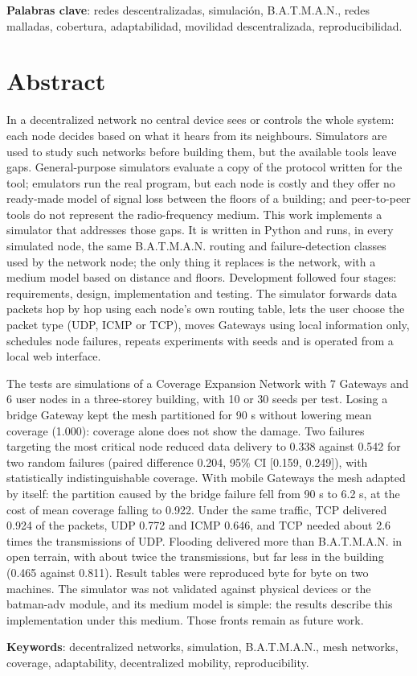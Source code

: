 \textbf{Palabras clave}: redes descentralizadas, simulación, B.A.T.M.A.N., redes
malladas, cobertura, adaptabilidad, movilidad descentralizada, reproducibilidad.

\newpage
\section*{Abstract}

In a decentralized network no central device sees or controls the whole system:
each node decides based on what it hears from its neighbours. Simulators are used
to study such networks before building them, but the available tools leave gaps.
General-purpose simulators evaluate a copy of the protocol written for the tool;
emulators run the real program, but each node is costly and they offer no
ready-made model of signal loss between the floors of a building; and
peer-to-peer tools do not represent the radio-frequency medium. This work
implements a simulator that addresses those gaps. It is written in Python and
runs, in every simulated node, the same B.A.T.M.A.N. routing and
failure-detection classes used by the network node; the only thing it replaces is
the network, with a medium model based on distance and floors. Development
followed four stages: requirements, design, implementation and testing. The
simulator forwards data packets hop by hop using each node's own routing table,
lets the user choose the packet type (UDP, ICMP or TCP), moves Gateways using
local information only, schedules node failures, repeats experiments with seeds
and is operated from a local web interface.

The tests are simulations of a Coverage Expansion Network with 7 Gateways and 6
user nodes in a three-storey building, with 10 or 30 seeds per test. Losing a bridge
Gateway kept the mesh partitioned for 90 s without lowering mean coverage (1.000):
coverage alone does not show the damage. Two failures targeting the most critical
node reduced data delivery to 0.338 against 0.542 for two random failures (paired
difference 0.204, 95\% CI [0.159, 0.249]), with statistically indistinguishable
coverage. With mobile Gateways the mesh adapted by itself: the partition caused
by the bridge failure fell from 90 s to 6.2 s, at the cost of mean coverage
falling to 0.922. Under the same traffic, TCP delivered 0.924 of the packets, UDP
0.772 and ICMP 0.646, and TCP needed about 2.6 times the transmissions of UDP.
Flooding delivered more than B.A.T.M.A.N. in open terrain, with about twice the
transmissions, but far less in the building (0.465 against 0.811). Result tables
were reproduced byte for byte on two machines. The simulator was not validated
against physical devices or the batman-adv module, and its medium model is
simple: the results describe this implementation under this medium. Those fronts
remain as future work.

\textbf{Keywords}: decentralized networks, simulation, B.A.T.M.A.N., mesh networks,
coverage, adaptability, decentralized mobility, reproducibility.
